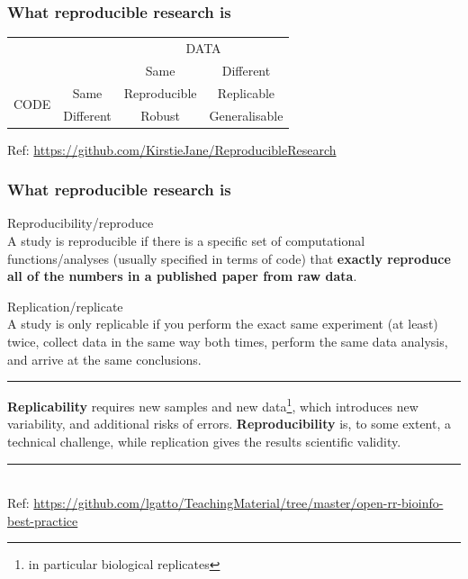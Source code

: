 \documentclass{beamer}
\begin{document}
\begin{frame}
\frametitle{What reproducible research is}
\begin{table}[]
\centering
\begin{tabular}{cccc}
                                           &                                & \multicolumn{2}{c}{DATA}                          \\ \cline{3-4}
                                           & \multicolumn{1}{c|}{}          & Same         & \multicolumn{1}{c|}{Different}     \\ \cline{2-4}
\multicolumn{1}{c|}{\multirow{2}{*}{CODE}} & \multicolumn{1}{c|}{Same}      & Reproducible & \multicolumn{1}{c|}{Replicable}    \\
\multicolumn{1}{c|}{}                      & \multicolumn{1}{c|}{Different} & Robust       & \multicolumn{1}{c|}{Generalisable} \\ \cline{2-4}
\end{tabular}
\end{table}
\vspace{3px}
\tiny Ref: {\url{https://github.com/KirstieJane/ReproducibleResearch}}
\end{frame}


\begin{frame}
\frametitle{What reproducible research is}

\Large{Reproducibility/reproduce}\\ \footnotesize A study is reproducible if there is a specific set of computational functions/analyses (usually specified in terms of code) that \textbf{exactly reproduce all of the numbers in a published paper from raw data}.

\Large{Replication/replicate}\\ \footnotesize A study is only replicable if you perform the exact same experiment (at least) twice, collect data in the same way both times, perform the same data analysis, and arrive at the same conclusions.
\rule{\textwidth}{0.05pt}
{\bf Replicability} requires new samples and new data\footnote{\tiny{in particular biological replicates}}, which introduces new variability, and additional risks of errors. {\bf Reproducibility} is, to some extent, a technical challenge, while replication gives the results scientific validity.
\rule{\textwidth}{0.05pt}\\
\vspace{3px}
\tiny Ref: {\url{https://github.com/lgatto/TeachingMaterial/tree/master/open-rr-bioinfo-best-practice}}
\end{frame}
\end{document}
